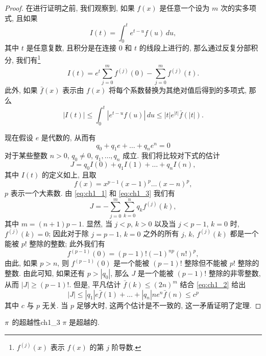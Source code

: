 \begin{proof}
在进行证明之前, 我们观察到, 如果 $f(x)$ 是任意一个设为 $m$ 次的实多项式, 且如果
\[
I(t) = \int_0^t e^{t-u} f(u) \, du,
\]
其中 $t$ 是任意复数, 且积分是在连接 $0$ 和 $t$ 的线段上进行的, 那么通过反复分部积分, 我们有\footnote{$f^{(j)}(x)$ 表示 $f(x)$ 的第 $j$ 阶导数.}
\begin{equation} \label{eq:ch1_1}\tag{1}
I(t) = e^t \sum_{j=0}^m f^{(j)}(0) - \sum_{j=0}^m f^{(j)}(t).
\end{equation}
此外, 如果 $\bar{f}(x)$ 表示由 $f(x)$ 将每个系数替换为其绝对值后得到的多项式, 那么
\begin{equation} \label{eq:ch1_2}\tag{2}
|I(t)| \le \int_0^t |e^{t-u} f(u)| \, du \le |t| e^{|t|} \bar{f}(|t|).
\end{equation}

现在假设 $e$ 是代数的, 从而有
\begin{equation} \label{eq:ch1_3}\tag{3}
q_0 + q_1 e + \dots + q_n e^n = 0
\end{equation}
对于某些整数 $n>0$, $q_0 \neq 0$, $q_1, \dots, q_n$ 成立. 我们将比较对下式的估计
\[
J = q_0 I(0) + q_1 I(1) + \dots + q_n I(n),
\]
其中 $I(t)$ 的定义如上, 且取
\[
f(x) = x^{p-1} (x-1)^p \dots (x-n)^p,
\]
$p$ 表示一个大素数. 由 \eqref{eq:ch1_1} 和 \eqref{eq:ch1_3} 我们有
\[
J = -\sum_{j=0}^{m} \sum_{k=0}^{n} q_k f^{(j)}(k),
\]
其中 $m = (n+1)p - 1. $ 显然, 当 $j < p$, $k > 0$ 以及当 $j < p-1$, $k = 0$ 时, $f^{(j)}(k) = 0$; 因此对于除 $j = p-1$, $k = 0$ 之外的所有 $j$, $k$, $f^{(j)}(k)$ 都是一个能被 $p!$ 整除的整数; 此外我们有
\[
f^{(p-1)}(0) = (p-1)! (-1)^{np} (n!)^p,
\]
由此, 如果 $p > n$, 则 $f^{(p-1)}(0)$ 是一个能被 $(p-1)!$ 整除但不能被 $p!$ 整除的整数. 由此可知, 如果还有 $p > |q_0|$, 那么 $J$ 是一个能被 $(p-1)!$ 整除的非零整数, 从而 $|J| \ge (p-1)!$. 但是, 平凡估计 $\bar{f}(k) \le (2n)^m$ 结合 \eqref{eq:ch1_2} 给出
\[
|J| \le |q_1| e \bar{f}(1) + \dots + |q_n| n e^n \bar{f}(n) \le c^p
\]
其中 $c$ 与 $p$ 无关. 当 $p$ 足够大时, 这两个估计是不一致的, 这一矛盾证明了定理.
\end{proof}


\begin{mythm}{$\pi\index{transcendence of  $\pi$}$ 的超越性}{ch1_3}
$\pi$ 是超越的.
\end{mythm}

